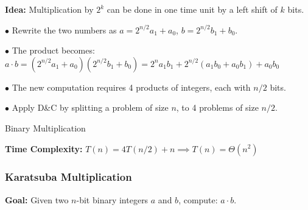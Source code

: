 \documentclass[10pt]{article}
\begin{document}
\textbf{Idea:} Multiplication by $2^k$ can be done in one time unit by a left shift of $k$ bits.

$\bullet$ Rewrite the two numbers as $a = 2^{n/2} a_1 + a_0$, $b = 2^{n/2} b_1 + b_0$.

$\bullet$ The product becomes: $a\cdot b = (2^{n/2} a_1 + a_0)(2^{n/2} b_1 + b_0) = 2^n a_1 b_1 + 2^{n/2} (a_1 b_0 + a_0 b_1) + a_0 b_0$

$\bullet$ The new computation requires 4 products of integers, each with $n/2$ bits.

$\bullet$ Apply D\&C by splitting a problem of size $n$, to 4 problems of size $n/2$.

\begin{algorithm}
	\SetAlgoLined
	\caption{Binary Multiplication}
\end{algorithm}

\textbf{Time Complexity:} $T(n) = 4T(n/2) + n\implies T(n) = \Theta(n^2)$

\newpage

\subsubsection{Karatsuba Multiplication}

\textbf{Goal:} Given two $n$-bit binary integers $a$ and $b$, compute: $a\cdot b$.
\end{document}
